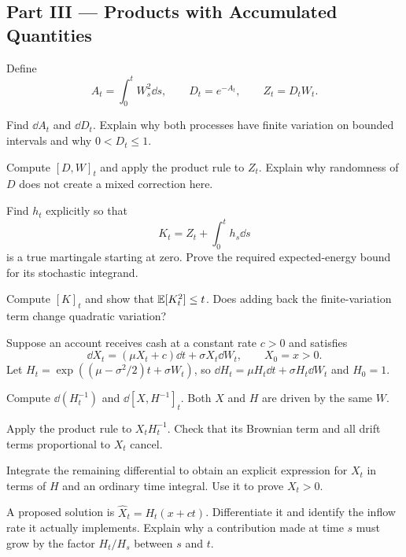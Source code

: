 \clearpage
\subsection*{Part III --- Products with Accumulated Quantities}

\begin{exercise}
Define
\[
A_t=\int_0^t W_s^2\dd s,
\qquad D_t=e^{-A_t},
\qquad Z_t=D_tW_t.
\]
\begin{exparts}
  \item Find \(\dd A_t\) and \(\dd D_t\). Explain why both processes
  have finite variation on bounded intervals and why \(0<D_t\leq1\).
  \item Compute \([D,W]_t\) and apply the product rule to \(Z_t\).
  Explain why randomness of \(D\) does not create a mixed correction here.
  \item Find \(h_t\) explicitly so that
  \[
  K_t=Z_t+\int_0^t h_s\dd s
  \]
  is a true martingale starting at zero. Prove the required expected-energy
  bound for its stochastic integrand.
  \item Compute \([K]_t\) and show that \(\mathbb{E}[K_t^2]\leq t\).
  Does adding back the finite-variation term change quadratic variation?
\end{exparts}
\end{exercise}

\begin{exercise}
Suppose an account receives cash at a constant rate \(c>0\) and satisfies
\[
\dd X_t=(\mu X_t+c)\dd t+\sigma X_t\dd W_t,
\qquad X_0=x>0.
\]
Let \(H_t=\exp((\mu-\sigma^2/2)t+\sigma W_t)\), so
\(\dd H_t=\mu H_t\dd t+\sigma H_t\dd W_t\) and \(H_0=1\).
\begin{exparts}
  \item Compute \(\dd(H_t^{-1})\) and \(\dd[X,H^{-1}]_t\).
  Both \(X\) and \(H\) are driven by the same \(W\).
  \item Apply the product rule to \(X_tH_t^{-1}\). Check that its
  Brownian term and all drift terms proportional to \(X_t\) cancel.
  \item Integrate the remaining differential to obtain an explicit
  expression for \(X_t\) in terms of \(H\) and an ordinary time integral.
  Use it to prove \(X_t>0\).
  \item A proposed solution is \(\widehat X_t=H_t(x+ct)\).
  Differentiate it and identify the inflow rate it actually implements.
  Explain why a contribution made at time \(s\) must grow by the factor
  \(H_t/H_s\) between \(s\) and \(t\).
\end{exparts}
\end{exercise}

